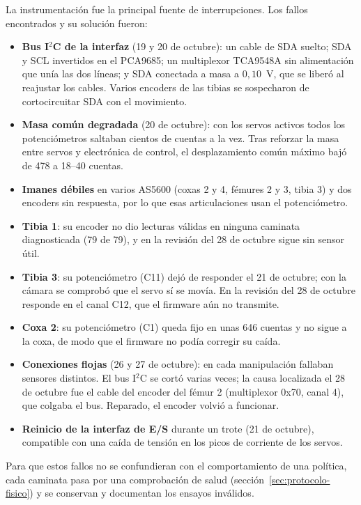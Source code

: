 La instrumentación fue la principal fuente de interrupciones. Los fallos
encontrados y su solución fueron:
\begin{itemize}
    \item \textbf{Bus I$^2$C de la interfaz} (19 y 20 de octubre): un cable de SDA
    suelto; SDA y SCL invertidos en el PCA9685; un multiplexor TCA9548A sin
    alimentación que unía las dos líneas; y SDA conectada a masa a $0{,}10$~V,
    que se liberó al reajustar los cables. Varios encoders de las tibias se
    sospecharon de cortocircuitar SDA con el movimiento.
    \item \textbf{Masa común degradada} (20 de octubre): con los servos activos
    todos los potenciómetros saltaban cientos de cuentas a la vez. Tras reforzar
    la masa entre servos y electrónica de control, el desplazamiento común máximo bajó de 478 a
    18--40 cuentas.
    \item \textbf{Imanes débiles} en varios AS5600 (coxas 2 y 4, fémures 2 y 3,
    tibia 3) y dos encoders sin respuesta, por lo que esas articulaciones usan
    el potenciómetro.
    \item \textbf{Tibia 1}: su encoder no dio lecturas válidas en ninguna caminata
    diagnosticada (79 de 79), y en la revisión del 28 de octubre sigue sin sensor útil.
    \item \textbf{Tibia 3}: su potenciómetro (C11) dejó de responder el 21 de
    octubre; con la cámara se comprobó que el servo sí se movía. En la revisión del
    28 de octubre responde en el canal C12, que el firmware aún no transmite.
    \item \textbf{Coxa 2}: su potenciómetro (C1) queda fijo en unas 646 cuentas y no
    sigue a la coxa, de modo que el firmware no podía corregir su caída.
    \item \textbf{Conexiones flojas} (26 y 27 de octubre): en cada manipulación
    fallaban sensores distintos. El bus I$^2$C se cortó varias veces; la causa
    localizada el 28 de octubre fue el cable del encoder del fémur 2 (multiplexor
    0x70, canal 4), que colgaba el bus. Reparado, el encoder volvió a funcionar.
    \item \textbf{Reinicio de la interfaz de E/S} durante un trote (21 de octubre), compatible
    con una caída de tensión en los picos de corriente de los servos.
\end{itemize}
Para que estos fallos no se confundieran con el comportamiento de una política,
cada caminata pasa por una comprobación de salud
(sección~\ref{sec:protocolo-fisico}) y se conservan y documentan los ensayos
inválidos.

